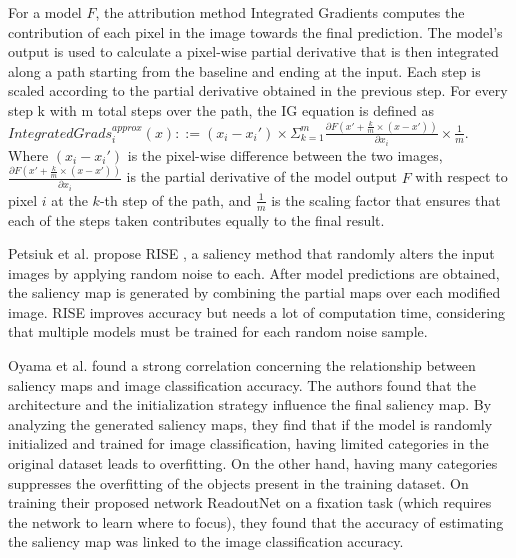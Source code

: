 For a model $F$, the attribution method Integrated Gradients \cite{sundararajanAxiomaticAttributionDeep2017} computes the contribution of each pixel in the image towards the final prediction. The model's output is used to calculate a pixel-wise partial derivative that is then integrated along a path starting from the baseline and ending at the input. Each step is scaled according to the partial derivative obtained in the previous step. For every step k with m total steps over the path, the IG equation is defined as $IntegratedGrads_i^{approx}(x)::=(x_{i}-x_i')\times \Sigma_{k=1}^{m}\frac{\partial F(x' + \frac{k}{m} \times (x-x'))}{\partial x_{i}} \times \frac{1}{m}$. Where $(x_{i} - x_{i}')$ is the pixel-wise difference between the two images, $\frac{\partial F(x' + \frac{k}{m} \times (x-x'))}{\partial x_i}$ is the partial derivative of the model output $F$ with respect to pixel $i$ at the $k$-th step of the path, and $\frac{1}{m}$ is the scaling factor that ensures that each of the steps taken contributes equally to the final result.

Petsiuk et al. propose RISE \cite{petsiukRISERandomizedInput2018}, a saliency method that randomly alters the input images by applying random noise to each. After model predictions are obtained, the saliency map is generated by combining the partial maps over each modified image. RISE improves accuracy but needs a lot of computation time, considering that multiple models must be trained for each random noise sample.

Oyama et al. \cite{oyamaInfluenceImageClassification2018} found a strong correlation concerning the relationship between saliency maps and image classification accuracy. The authors found that the architecture and the initialization strategy influence the final saliency map. By analyzing the generated saliency maps, they find that if the model is randomly initialized and trained for image classification, having limited categories in the original dataset leads to overfitting. On the other hand, having many categories suppresses the overfitting of the objects present in the training dataset. On training their proposed network ReadoutNet on a fixation task (which requires the network to learn where to focus), they found that the accuracy of estimating the saliency map was linked to the image classification accuracy.

